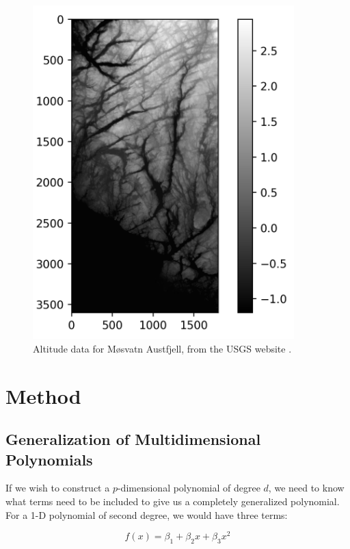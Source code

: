 \documentclass[a4paper,10pt,english]{article}
\begin{document}
	\begin{figure}[H]
		\centering
		\includegraphics[width = 0.9\textwidth, center]{real_data.png}
		\caption{Altitude data for Møsvatn Austfjell, from the USGS website \cite{earthexplorer}.\label{fig_austfjell}}
	\end{figure}	

\section*{Method}
\label{sec:method}

	\subsection*{Generalization of Multidimensional Polynomials}
	
	If we wish to construct a $p$-dimensional polynomial of degree $d$, we need to know what terms need to be included to give us a completely generalized polynomial.  For a 1-D polynomial of second degree, we would have three terms:
	
	\begin{equation*}
	f(x) = \beta_1 + \beta_2 x + \beta_3 x^2
	\end{equation*}
	
\end{document}

